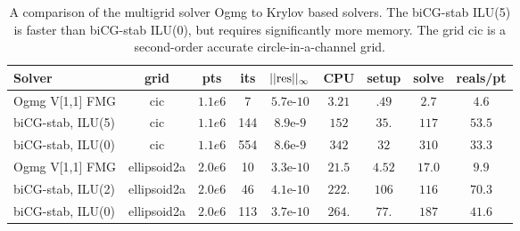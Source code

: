 \begin{table}[hbt]
\begin{center}
\begin{tabular}{|l|c|c|c|c|c|c|c|c|} \hline 
 Solver             & grid     & pts     & its  & $\vert\vert \mbox{res} \vert\vert_\infty$   & CPU    &  setup & solve  & reals/pt\\   \hline 
 Ogmg V[1,1] FMG    & cic      & $1.1e6$ &   7  & $5.7$e-$10$ & $3.21$ &  $.49$ & $2.7$ & $4.6$    \\ 
 biCG-stab, ILU(5)  & cic      & $1.1e6$ &  144 & $8.9$e-$9$  & $152$  &  $35.$ & $117$  & $53.5$    \\ 
 biCG-stab, ILU(0)  & cic      & $1.1e6$ &  554 & $8.6$e-$9$  & $342$  &  $32$  & $310$  & $33.3$    \\ \hline
%
 Ogmg V[1,1] FMG & ellipsoid2a & $2.0e6$ &  10  & $3.3$e-$10$ & $21.5$ & $4.52$ & $17.0$ & $9.9$   \\ 
 biCG-stab, ILU(2) & ellipsoid2a & $2.0e6$ &  46  & $4.1$e-$10$ &$222.$  & $106$  & $116$  & $ 70.3$    \\
 biCG-stab, ILU(0) & ellipsoid2a& $2.0e6$ &  113 & $3.7$e-$10$ &$264.$  & $77.$  & $187$  & $ 41.6$    \\
\hline 
\end{tabular}
\end{center}
\caption{A comparison of the multigrid solver Ogmg to Krylov based solvers. The biCG-stab ILU(5) is faster than
biCG-stab ILU(0), but requires significantly more memory. The grid cic is a second-order accurate circle-in-a-channel
grid.}
\label{tab:comparison} 
\end{table}



